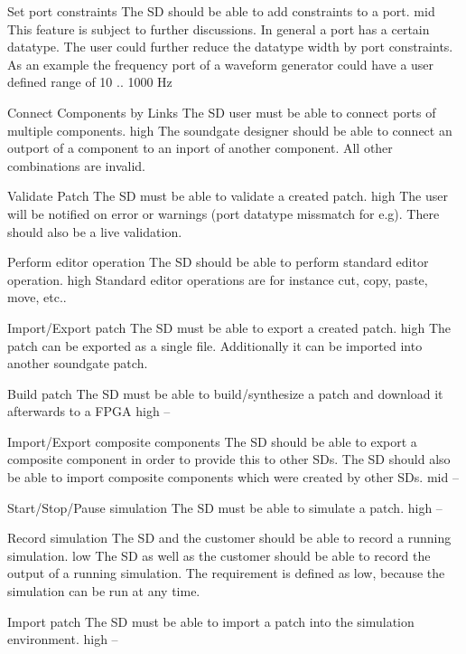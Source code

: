 	{Set port constraints}
	{The SD should be able to add constraints to a port.}
	{mid}
	{This feature is subject to further discussions. In general a port has a certain datatype. The user could further reduce the datatype width by port constraints. As an example the frequency port of a waveform generator could have a user defined range of 10 .. 1000 Hz }
	
	{Connect Components by Links}
	{The SD user must be able to connect ports of multiple components.}
	{high}
	{The soundgate designer should be able to connect an outport of a component to an inport of another component. All other combinations are invalid.}
	
	{Validate Patch}
	{The SD must be able to validate a created patch.}
	{high}
	{The user will be notified on error or warnings (port datatype missmatch for e.g). There should also be a live validation.}
	
	{Perform editor operation}
	{The SD should be able to perform standard editor operation.}
	{high}
	{Standard editor operations are for instance cut, copy, paste, move, etc..}
	
	{Import/Export patch}
	{The SD must be able to export a created patch.}
	{high}
	{The patch can be exported as a single file. Additionally it can be imported into another soundgate patch.}
	
	{Build patch}
	{The SD must be able to build/synthesize a patch and download it afterwards to a FPGA}
	{high}
	{--}
	
	{Import/Export composite components}
	{The SD should be able to export a composite component in order to provide this to other SDs. The SD should also be able to import composite components which were created by other SDs.}
	{mid}
	{--}
	
	{Start/Stop/Pause simulation}
	{The SD must be able to simulate a patch.}
	{high}
	{--}
	
	{Record simulation}
	{The SD and the customer should be able to record a running simulation.}
	{low}
	{The SD as well as the customer should be able to record the output of a running simulation. The requirement is defined as low, because the simulation can be run at any time.}
	
	{Import patch}
	{The SD must be able to import a patch into the simulation environment.}
	{high}
	{--}
	
